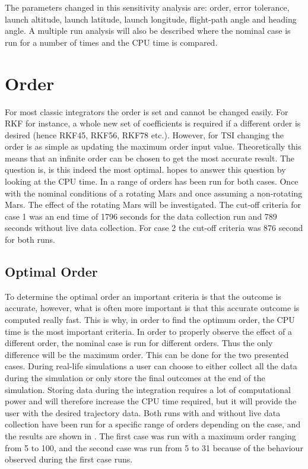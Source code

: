 \noindent
The parameters changed in this sensitivity analysis are: order, error tolerance, launch altitude, launch latitude, launch longitude, flight-path angle and heading angle. A multiple run analysis will also be described where the nominal case is run for a number of times and the CPU time is compared. 


\section{Order}
\label{sec:order}
For most classic integrators the order is set and cannot be changed easily. For \ac{RKF} for instance, a whole new set of coefficients is required if a different order is desired (hence \ac{RKF45}, \ac{RKF56}, \ac{RKF78} etc.). However, for \ac{TSI} changing the order is as simple as updating the maximum order input value. Theoretically this means that an infinite order can be chosen to get the most accurate result. The question is, is this indeed the most optimal.  hopes to answer this question by looking at the CPU time. In  a range of orders has been run for both cases. Once with the nominal conditions of a rotating Mars and once assuming a non-rotating Mars. The effect of the rotating Mars will be investigated. The cut-off criteria for case 1 was an end time of 1796 seconds for the data collection run and 789 seconds without live data collection. For case 2 the cut-off criteria was 876 second for both runs.

\subsection{Optimal Order}
\label{subsec:optimalOrder}
To determine the optimal order an important criteria is that the outcome is accurate, however, what is often more important is that this accurate outcome is computed really fast. This is why, in order to find the optimum order, the CPU time is the most important criteria. In order to properly observe the effect of a different order, the nominal case is run for different orders. Thus the only difference will be the maximum order. This can be done for the two presented cases. During real-life simulations a user can choose to either collect all the data during the simulation or only store the final outcomes at the end of the simulation. Storing data during the integration requires a lot of computational power and will therefore increase the CPU time required, but it will provide the user with the desired trajectory data. Both runs with and without live data collection have been run for a specific range of orders depending on the case, and the results are shown in .
The first case was run with a maximum order ranging from 5 to 100, and the second case was run from 5 to 31 because of the behaviour observed during the first case runs. 



